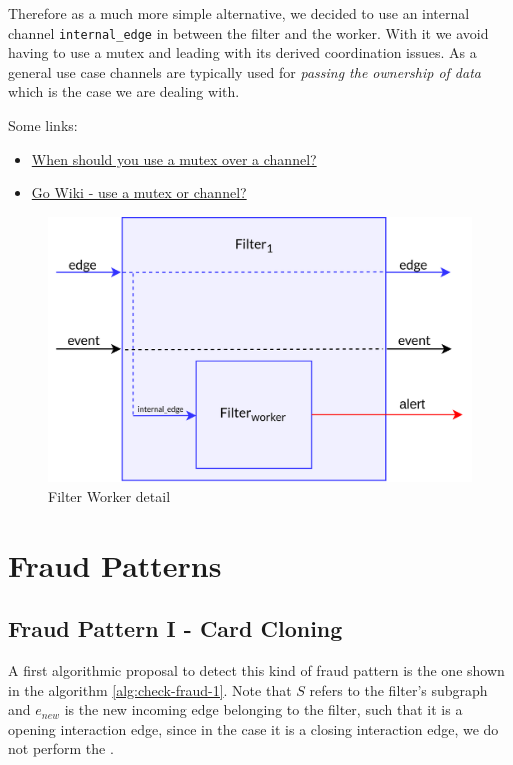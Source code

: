 \documentclass{article}
\begin{document}
Therefore as a much more simple alternative, we decided to use an internal channel \texttt{internal\_edge} in between the filter and the worker. With it we avoid having to use a mutex and leading with its derived coordination issues. As a general use case channels are typically used for \emph{passing the ownership of data} which is the case we are dealing with.

Some links:
\begin{itemize}
  \item \href{https://stackoverflow.com/questions/47312029/when-should-you-use-a-mutex-over-a-channel}{When should you use a mutex over a channel?}
  \item \href{https://go.dev/wiki/MutexOrChannel}{Go Wiki - use a mutex or channel?}
\end{itemize}





\begin{figure}[H]
  \centering
  \includegraphics[scale = 0.7]{images/filter-worker.png}
  \caption{Filter Worker detail}
  \label{img:pipeline-schema}
\end{figure}



\section{Fraud Patterns}

\subsection{Fraud Pattern I - Card Cloning}

A first algorithmic proposal to detect this kind of fraud pattern is the one shown in the algorithm
\ref{alg:check-fraud-1}. Note that $S$ refers to the filter's subgraph and $e_{new}$ is the new incoming edge belonging to the filter, such that it is a opening interaction edge, since in the case it is a closing interaction edge, we do not perform the .
\end{document}
